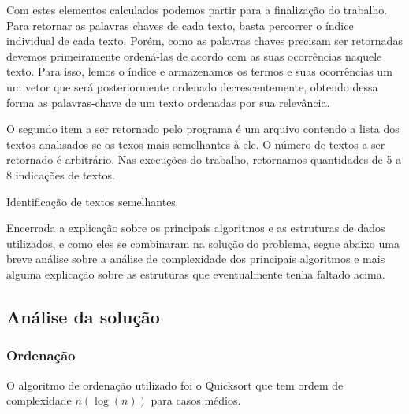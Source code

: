 \documentclass[12pt]{article}
\begin{document}
Com estes elementos calculados podemos partir para a finalização do trabalho.
Para retornar as palavras chaves de cada texto, basta percorrer o índice
individual de cada texto. Porém, como as palavras chaves precisam ser retornadas
devemos primeiramente ordená-las de acordo com as suas ocorrências naquele
texto. Para isso, lemos o índice e armazenamos os termos e suas ocorrências um
um vetor que será posteriormente ordenado decrescentemente, obtendo dessa forma
as palavras-chave de um texto ordenadas por sua relevância.

O segundo item a ser retornado pelo programa é um arquivo contendo a lista dos
textos analisados se os texos mais semelhantes à ele. O número de textos a ser
retornado é arbitrário. Nas execuções do trabalho, retornamos quantidades de 5 a
8 indicações de textos.

\begin{algorithm}[h!]
\begin{footnotesize}
\caption{Identificação de textos semelhantes}
\end{footnotesize}
\end{algorithm}

Encerrada a explicação sobre os principais algoritmos e as estruturas de dados
utilizados, e como eles se combinaram na solução do problema, segue abaixo uma
breve análise sobre a análise de complexidade dos principais algoritmos e mais
alguma explicação sobre as estruturas que eventualmente tenha faltado acima.

\subsection{Análise da solução}

\subsubsection{Ordenação}
O algoritmo de ordenação utilizado foi o Quicksort que tem ordem de complexidade
$n(\log(n))$ para casos médios.
\end{document}
